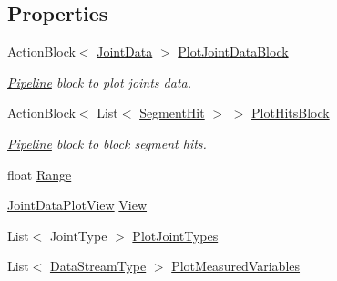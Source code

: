 \subsection*{Properties}
\begin{DoxyCompactItemize}
\item 
Action\+Block$<$ \hyperlink{struct_rowing_monitor_1_1_model_1_1_util_1_1_joint_data}{Joint\+Data} $>$ \hyperlink{class_rowing_monitor_1_1_model_1_1_pipeline_1_1_joint_data_plot_ac580ee2b3b8065298302bba6b23035d1}{Plot\+Joint\+Data\+Block}
\begin{DoxyCompactList}\small\item\em \hyperlink{namespace_rowing_monitor_1_1_model_1_1_pipeline}{Pipeline} block to plot joints data. \end{DoxyCompactList}\item 
Action\+Block$<$ List$<$ \hyperlink{struct_rowing_monitor_1_1_model_1_1_util_1_1_segment_hit}{Segment\+Hit} $>$ $>$ \hyperlink{class_rowing_monitor_1_1_model_1_1_pipeline_1_1_joint_data_plot_a695de68579c19a18da88d8498a1b9efa}{Plot\+Hits\+Block}
\begin{DoxyCompactList}\small\item\em \hyperlink{namespace_rowing_monitor_1_1_model_1_1_pipeline}{Pipeline} block to block segment hits. \end{DoxyCompactList}\item 
float \hyperlink{class_rowing_monitor_1_1_model_1_1_pipeline_1_1_joint_data_plot_a37144296343e14f93d65bbfb28725cb9}{Range}
\item 
\hyperlink{class_rowing_monitor_1_1_view_1_1_joint_data_plot_view}{Joint\+Data\+Plot\+View} \hyperlink{class_rowing_monitor_1_1_model_1_1_pipeline_1_1_joint_data_plot_a599fac0eeb5a00077a17f9359f32a224}{View}
\item 
List$<$ Joint\+Type $>$ \hyperlink{class_rowing_monitor_1_1_model_1_1_pipeline_1_1_joint_data_plot_a47e49071f1b58e6c2edec002becf8a67}{Plot\+Joint\+Types}
\item 
List$<$ \hyperlink{namespace_rowing_monitor_1_1_model_1_1_util_a01e1a06061533b246feb7421c9d0107f}{Data\+Stream\+Type} $>$ \hyperlink{class_rowing_monitor_1_1_model_1_1_pipeline_1_1_joint_data_plot_a95475a3d828259105ad1c08f8eb73504}{Plot\+Measured\+Variables}
\end{DoxyCompactItemize}


